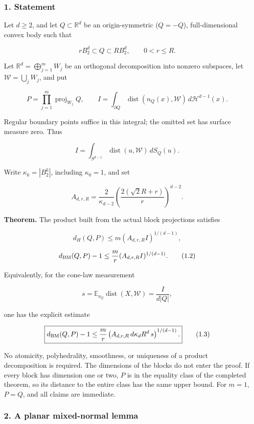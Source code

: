 \documentclass[
  11pt,
]{article}
\begin{document}
\subsubsection{1. Statement}\label{statement-1}

Let \(d\ge2\), and let \(Q\subset\mathbb R^d\) be an origin-symmetric
(\(Q=-Q\)), full-dimensional convex body such that

\[
rB_2^d\subset Q\subset RB_2^d,\qquad 0<r\le R.
\]

Let \(\mathbb R^d=\bigoplus_{j=1}^m W_j\) be an orthogonal decomposition
into nonzero subspaces, let \(\mathcal W=\bigcup_jW_j\), and put

\[
P=\prod_{j=1}^m\operatorname{proj}_{W_j}Q,
\qquad
I=\int_{\partial Q}\operatorname{dist}(n_Q(x),\mathcal W)
       \,d\mathcal H^{d-1}(x).
\]

Regular boundary points suffice in this integral; the omitted set has
surface measure zero. Thus

\[
I=\int_{S^{d-1}}\operatorname{dist}(u,\mathcal W)\,dS_Q(u).
\]

Write \(\kappa_k=|B_2^k|\), including \(\kappa_0=1\), and set

\[
 A_{d,r,R}=\frac{2}{\kappa_{d-2}}
       \left(\frac{2(\sqrt2R+r)}r\right)^{d-2}.
\]

\textbf{Theorem.} The product built from the actual block projections
satisfies

\[
 d_H(Q,P)\le m(A_{d,r,R}I)^{1/(d-1)},                 \tag{1.1}
\]

\[
 d_{\rm BM}(Q,P)-1
 \le\frac mr(A_{d,r,R}I)^{1/(d-1)}.                 \tag{1.2}
\]

Equivalently, for the cone-law measurement

\[
s=\mathbb E_{\nu_Q}\operatorname{dist}(X,\mathcal W)
  =\frac I{d|Q|},
\]

one has the explicit estimate

\[
\boxed{d_{\rm BM}(Q,P)-1
\le \frac mr
\left(A_{d,r,R}\,d\kappa_d R^d\,s\right)^{1/(d-1)}.}  \tag{1.3}
\]

No atomicity, polyhedrality, smoothness, or uniqueness of a product
decomposition is required. The dimensions of the blocks do not enter the
proof. If every block has dimension one or two, \(P\) is in the equality
class of the completed theorem, so its distance to the entire class has
the same upper bound. For \(m=1\), \(P=Q\), and all claims are
immediate.

\subsubsection{2. A planar mixed-normal
lemma}\label{a-planar-mixed-normal-lemma}
\end{document}
